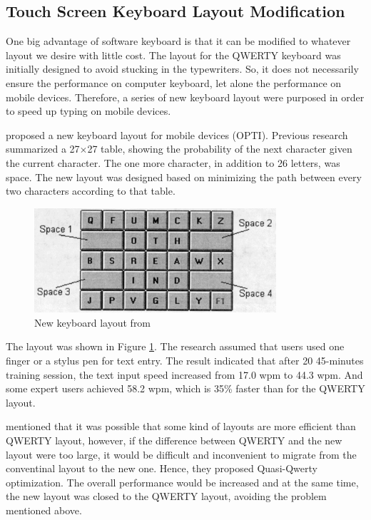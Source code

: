 \documentclass[11pt]{article}
\begin{document}
\subsection{Touch Screen Keyboard Layout Modification}
One big advantage of software keyboard is that it can be modified to whatever layout we desire with little cost. The layout for the QWERTY keyboard was initially designed to avoid stucking in the typewriters. So, it does not necessarily ensure the performance on computer keyboard, let alone the performance on mobile devices. Therefore, a series of new keyboard layout were purposed in order to speed up typing on mobile devices.

\citet{10.1145/302979.302983} proposed a new keyboard layout for mobile devices (OPTI). Previous research summarized a 27$\times$27 table, showing the probability of the next character given the current character. The one more character, in addition to 26 letters, was space. The new layout was designed based on minimizing the path between every two characters according to that table.

\begin{figure}[H]
  \centering
  \includegraphics[width=0.8\textwidth]{Layout1999.png}
  \caption{New keyboard layout from \citep{10.1145/302979.302983}}
  \label{fig:layout1999}
\end{figure}

The layout was shown in Figure \ref{fig:layout1999}. The research assumed that users used one finger or a stylus pen for text entry. The result indicated that after 20 45-minutes training session, the text input speed increased from 17.0 wpm to 44.3 wpm. And some expert users achieved 58.2 wpm, which is 35\% faster than for the QWERTY layout. 

\citet{10.1145/1753326.1753367} mentioned that it was possible that some kind of layouts are more efficient than QWERTY layout, however, if the difference between QWERTY and the new layout were too large, it would be difficult and inconvenient to migrate from the conventinal layout to the new one. Hence, they proposed Quasi-Qwerty optimization. The overall performance would be increased and at the same time, the new layout was closed to the QWERTY layout, avoiding the problem mentioned above. 
\end{document}
